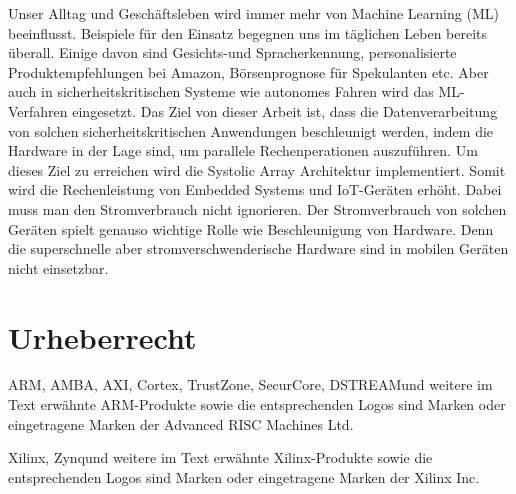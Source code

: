 Unser Alltag und Geschäftsleben wird immer mehr von Machine Learning (ML) beeinflusst. Beispiele für den Einsatz begegnen uns im täglichen Leben bereits überall. Einige davon sind Gesichts-und Spracherkennung, personalisierte Produktempfehlungen bei Amazon, Börsenprognose für Spekulanten etc. Aber auch in sicherheitskritischen Systeme wie autonomes Fahren wird das ML-Verfahren eingesetzt. Das Ziel von dieser Arbeit ist, dass die Datenverarbeitung von solchen sicherheitskritischen Anwendungen beschleunigt werden, indem die Hardware in der Lage sind, um parallele Rechenperationen auszuführen. Um dieses Ziel zu erreichen wird die Systolic Array Architektur implementiert. Somit wird die Rechenleistung von Embedded Systems und IoT-Geräten erhöht. Dabei muss man den Stromverbrauch nicht ignorieren. Der Stromverbrauch von solchen Geräten spielt genauso wichtige Rolle wie Beschleunigung von Hardware. Denn die superschnelle  aber stromverschwenderische Hardware sind in mobilen Geräten nicht einsetzbar.  



\chapter*{Urheberrecht}

ARM\TReg, AMBA\TReg, AXI\TTra, Cortex\TTra, TrustZone\TTra, SecurCore\TTra  , DSTREAM\TTra und weitere im Text erwähnte ARM-Produkte sowie die entsprechenden Logos sind Marken oder eingetragene Marken der Advanced RISC Machines Ltd.\par
\vspace{0.5cm}
Xilinx\TReg, Zynq\TTra und weitere im Text erwähnte Xilinx-Produkte sowie die entsprechenden Logos sind Marken oder eingetragene Marken der Xilinx Inc.\par
\vspace{0.5cm}